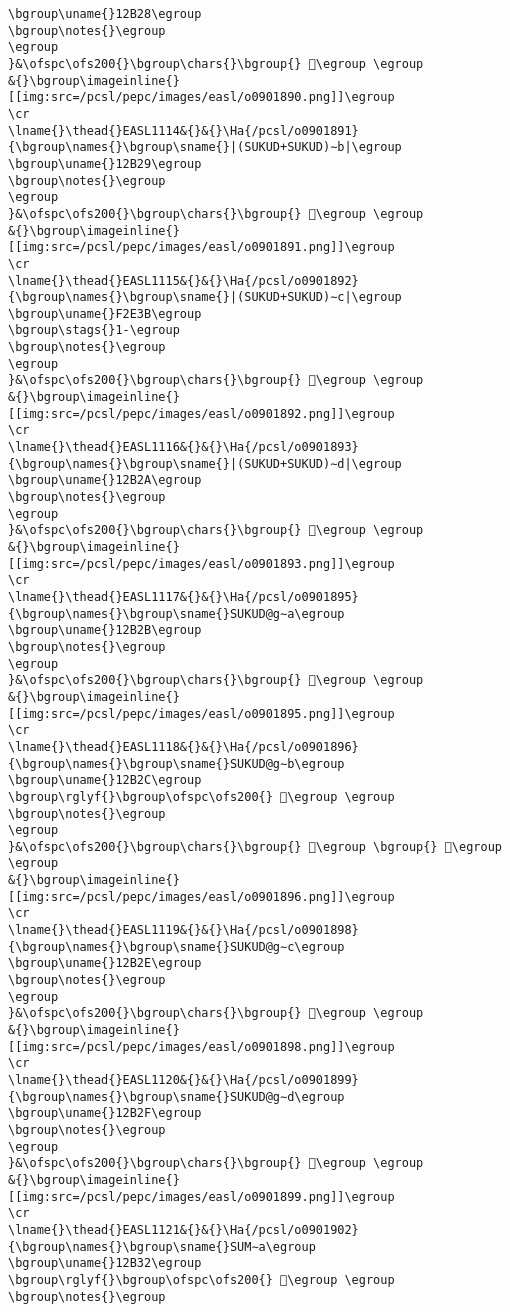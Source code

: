 \begin{verbatim}
\bgroup\uname{}12B28\egroup
\bgroup\notes{}\egroup
\egroup
}&\ofspc\ofs200{}\bgroup\chars{}\bgroup{} 𒬨\egroup \egroup
&{}\bgroup\imageinline{}[[img:src=/pcsl/pepc/images/easl/o0901890.png]]\egroup
\cr
\lname{}\thead{}EASL1114&{}&{}\Ha{/pcsl/o0901891}{\bgroup\names{}\bgroup\sname{}|(SUKUD+SUKUD)∼b|\egroup
\bgroup\uname{}12B29\egroup
\bgroup\notes{}\egroup
\egroup
}&\ofspc\ofs200{}\bgroup\chars{}\bgroup{} 𒬩\egroup \egroup
&{}\bgroup\imageinline{}[[img:src=/pcsl/pepc/images/easl/o0901891.png]]\egroup
\cr
\lname{}\thead{}EASL1115&{}&{}\Ha{/pcsl/o0901892}{\bgroup\names{}\bgroup\sname{}|(SUKUD+SUKUD)∼c|\egroup
\bgroup\uname{}F2E3B\egroup
\bgroup\stags{}1-\egroup
\bgroup\notes{}\egroup
\egroup
}&\ofspc\ofs200{}\bgroup\chars{}\bgroup{} 󲸻\egroup \egroup
&{}\bgroup\imageinline{}[[img:src=/pcsl/pepc/images/easl/o0901892.png]]\egroup
\cr
\lname{}\thead{}EASL1116&{}&{}\Ha{/pcsl/o0901893}{\bgroup\names{}\bgroup\sname{}|(SUKUD+SUKUD)∼d|\egroup
\bgroup\uname{}12B2A\egroup
\bgroup\notes{}\egroup
\egroup
}&\ofspc\ofs200{}\bgroup\chars{}\bgroup{} 𒬪\egroup \egroup
&{}\bgroup\imageinline{}[[img:src=/pcsl/pepc/images/easl/o0901893.png]]\egroup
\cr
\lname{}\thead{}EASL1117&{}&{}\Ha{/pcsl/o0901895}{\bgroup\names{}\bgroup\sname{}SUKUD@g∼a\egroup
\bgroup\uname{}12B2B\egroup
\bgroup\notes{}\egroup
\egroup
}&\ofspc\ofs200{}\bgroup\chars{}\bgroup{} 𒬫\egroup \egroup
&{}\bgroup\imageinline{}[[img:src=/pcsl/pepc/images/easl/o0901895.png]]\egroup
\cr
\lname{}\thead{}EASL1118&{}&{}\Ha{/pcsl/o0901896}{\bgroup\names{}\bgroup\sname{}SUKUD@g∼b\egroup
\bgroup\uname{}12B2C\egroup
\bgroup\rglyf{}\bgroup\ofspc\ofs200{} 𒬬\egroup \egroup
\bgroup\notes{}\egroup
\egroup
}&\ofspc\ofs200{}\bgroup\chars{}\bgroup{} 𒬬\egroup \bgroup{} 𒬭\egroup \egroup
&{}\bgroup\imageinline{}[[img:src=/pcsl/pepc/images/easl/o0901896.png]]\egroup
\cr
\lname{}\thead{}EASL1119&{}&{}\Ha{/pcsl/o0901898}{\bgroup\names{}\bgroup\sname{}SUKUD@g∼c\egroup
\bgroup\uname{}12B2E\egroup
\bgroup\notes{}\egroup
\egroup
}&\ofspc\ofs200{}\bgroup\chars{}\bgroup{} 𒬮\egroup \egroup
&{}\bgroup\imageinline{}[[img:src=/pcsl/pepc/images/easl/o0901898.png]]\egroup
\cr
\lname{}\thead{}EASL1120&{}&{}\Ha{/pcsl/o0901899}{\bgroup\names{}\bgroup\sname{}SUKUD@g∼d\egroup
\bgroup\uname{}12B2F\egroup
\bgroup\notes{}\egroup
\egroup
}&\ofspc\ofs200{}\bgroup\chars{}\bgroup{} 𒬯\egroup \egroup
&{}\bgroup\imageinline{}[[img:src=/pcsl/pepc/images/easl/o0901899.png]]\egroup
\cr
\lname{}\thead{}EASL1121&{}&{}\Ha{/pcsl/o0901902}{\bgroup\names{}\bgroup\sname{}SUM∼a\egroup
\bgroup\uname{}12B32\egroup
\bgroup\rglyf{}\bgroup\ofspc\ofs200{} 𒬲\egroup \egroup
\bgroup\notes{}\egroup

\end{verbatim}

